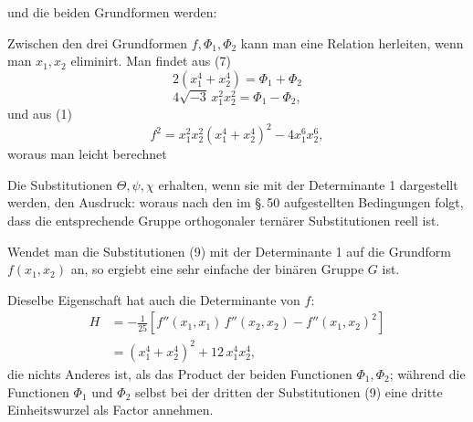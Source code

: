 und die beiden Grundformen werden:

Zwischen den drei Grundformen $f, \Phi_1, \Phi_2$ kann man eine
Relation herleiten, wenn man $x_1, x_2$ eliminirt. Man findet aus (7)
\[
2(x_1^4+x_2^4) = \Phi_1 + \Phi_2
\]
\[
4\sqrt{-3}\,x_1^2 x_2^2 = \Phi_1 - \Phi_2,
\]
und aus (1)
\[
f^2 = x_1^2 x_2^2 (x_1^4+x_2^4)^2 - 4x_1^6 x_2^6,
\]
woraus man leicht berechnet

Die Substitutionen $\Theta, \psi, \chi$ erhalten, wenn sie mit der Determinante
 1 dargestellt werden, den Ausdruck:
woraus nach den im \S.\,50 aufgestellten Bedingungen folgt, dass
die entsprechende Gruppe orthogonaler ternärer Substitutionen
reell ist.

Wendet man die Substitutionen (9) mit der Determinante 1
auf die Grundform $f(x_1, x_2)$ an, so ergiebt eine sehr einfache
der binären Gruppe $G$ ist.

Dieselbe Eigenschaft hat auch die  Determinante
von $f$:
\[
\begin{aligned}
H &= -\frac{1}{25}\left[f''(x_1,x_1)\,f''(x_2,x_2) - f''(x_1,x_2)^2\right] \\
&= (x_1^4+x_2^4)^2 + 12\,x_1^4 x_2^4,
\end{aligned}
\]
die nichts Anderes ist, als das Product der beiden Functionen
$\Phi_1, \Phi_2$; während die Functionen $\Phi_1$ und $\Phi_2$ selbst bei der dritten
der Substitutionen (9) eine dritte Einheitswurzel als Factor
annehmen.
